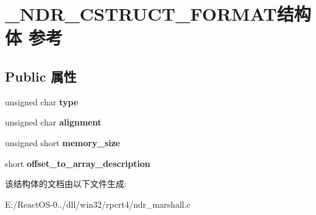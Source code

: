 \hypertarget{struct___n_d_r___c_s_t_r_u_c_t___f_o_r_m_a_t}{}\section{\+\_\+\+N\+D\+R\+\_\+\+C\+S\+T\+R\+U\+C\+T\+\_\+\+F\+O\+R\+M\+A\+T结构体 参考}
\label{struct___n_d_r___c_s_t_r_u_c_t___f_o_r_m_a_t}
\subsection*{Public 属性}
\begin{DoxyCompactItemize}
\item 
\mbox{\label{struct___n_d_r___c_s_t_r_u_c_t___f_o_r_m_a_t_ab4b61f26ce8082da6803b8262a062491}} 
unsigned char {\bfseries type}
\item 
\mbox{\label{struct___n_d_r___c_s_t_r_u_c_t___f_o_r_m_a_t_a0c09db341a9a060209798f491123aa0e}} 
unsigned char {\bfseries alignment}
\item 
\mbox{\label{struct___n_d_r___c_s_t_r_u_c_t___f_o_r_m_a_t_afbd3a98f802c8d103bb89b37bd8f86e5}} 
unsigned short {\bfseries memory\+\_\+size}
\item 
\mbox{\label{struct___n_d_r___c_s_t_r_u_c_t___f_o_r_m_a_t_a3763ada1dd3e7c8b450f9047aeb3d9ea}} 
short {\bfseries offset\+\_\+to\+\_\+array\+\_\+description}
\end{DoxyCompactItemize}


该结构体的文档由以下文件生成\+:\begin{DoxyCompactItemize}
\item 
E\+:/\+React\+O\+S-\/0../dll/win32/rpcrt4/ndr\+\_\+marshall.\+c\end{DoxyCompactItemize}
